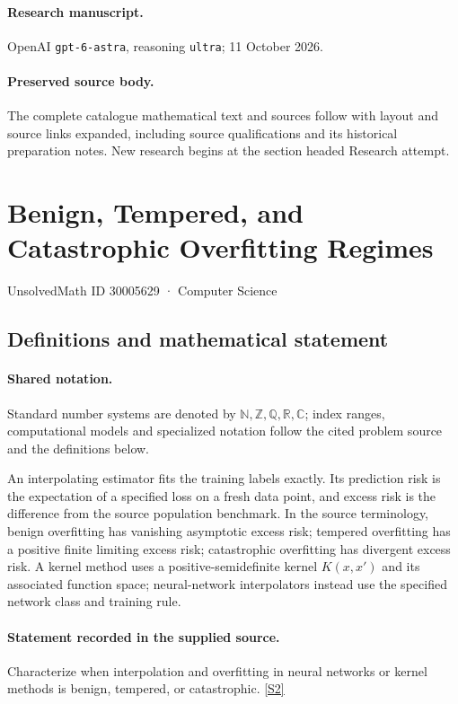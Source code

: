 \documentclass[11pt]{article}
\begin{document}
\paragraph{Research manuscript.} OpenAI \texttt{gpt-6-astra}, reasoning \texttt{ultra}; 11 October 2026.
\paragraph{Preserved source body.} The complete catalogue mathematical text and sources follow with layout and source links expanded, including source qualifications and its historical preparation notes. New research begins at the section headed Research attempt.

\section{Benign, Tempered, and Catastrophic Overfitting Regimes}\label{30005629}
{\small UnsolvedMath ID 30005629 · Computer Science}
\subsection{Definitions and mathematical statement}

\paragraph{Shared notation.}Standard number systems are denoted by $\mathbb N,\mathbb Z,\mathbb Q,\mathbb R,\mathbb C$; index ranges, computational models and specialized notation follow the cited problem source and the definitions below.


An interpolating estimator fits the training labels exactly. Its prediction risk is the expectation of a specified loss on a fresh data point, and excess risk is the difference from the source population benchmark. In the source terminology, benign overfitting has vanishing asymptotic excess risk; tempered overfitting has a positive finite limiting excess risk; catastrophic overfitting has divergent excess risk. A kernel method uses a positive-semidefinite kernel $K(x,x')$ and its associated function space; neural-network interpolators instead use the specified network class and training rule.
\paragraph{Statement recorded in the supplied source.}
Characterize when interpolation and overfitting in neural networks or kernel methods is benign, tempered, or catastrophic. \href{https://doi.org/10.4171/owr/2023/41}{[S2]}
\end{document}
